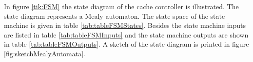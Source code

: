
In figure \ref{tik:FSM} the state diagram of the cache controller is illustrated. The state diagram represents a Mealy automaton. The state space of the state machine is given in table \ref{tab:tableFSMStates}.
Besides the state machine inputs are listed in table \ref{tab:tableFSMInputs} and the state machine outputs are shown in table \ref{tab:tableFSMOutputs}. A sketch of the state diagram is printed in figure \ref{fig:sketchMealyAutomata}.



